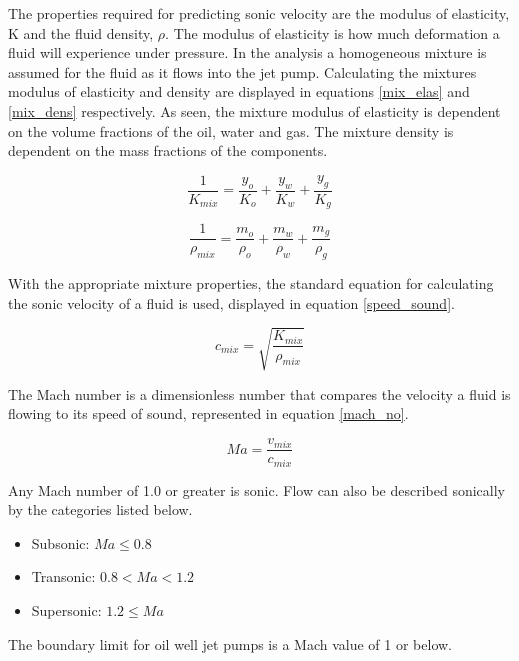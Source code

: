 \documentclass[12 pt]{report}
\begin{document}
The properties required for predicting sonic velocity are the modulus of elasticity, K and the fluid density, $\rho$. The modulus of elasticity is how much deformation a fluid will experience under pressure. In the analysis a homogeneous mixture is assumed for the fluid as it flows into the jet pump. Calculating the mixtures modulus of elasticity and density are displayed in equations \eqref{mix_elas} and \eqref{mix_dens} respectively. As seen, the mixture modulus of elasticity is dependent on the volume fractions of the oil, water and gas. The mixture density is dependent on the mass fractions of the components.

\begin{equation}
\frac{1}{K_{mix}} = \frac{y_{o}}{K_{o}} + \frac{y_{w}}{K_{w}} + \frac{y_{g}}{K_{g}}
\label{mix_elas}
\end{equation}

\begin{equation}
\frac{1}{\rho_{mix}} = \frac{m_{o}}{\rho_{o}} + \frac{m_{w}}{\rho_{w}} + \frac{m_{g}}{\rho_{g}}
\label{mix_dens}
\end{equation}

With the appropriate mixture properties, the standard equation for calculating the sonic velocity of a fluid is used, displayed in equation \eqref{speed_sound}. 

\begin{equation}
c_{mix} = \sqrt{\frac{K_{mix}}{\rho_{mix}}}
\label{speed_sound}
\end{equation}

The Mach number is a dimensionless number that compares the velocity a fluid is flowing to its speed of sound, represented in equation \eqref{mach_no}.

\begin{equation}
Ma = \frac{v_{mix}}{c_{mix}}
\label{mach_no}
\end{equation}

Any Mach number of 1.0 or greater is sonic. Flow can also be described sonically by the categories listed below.

\begin{itemize}
    \item Subsonic: $Ma \leq 0.8$
    \item Transonic: $0.8 < Ma < 1.2$
    \item Supersonic: $1.2 \leq Ma$
\end{itemize}

The boundary limit for oil well jet pumps is a Mach value of 1 or below.
\end{document}
